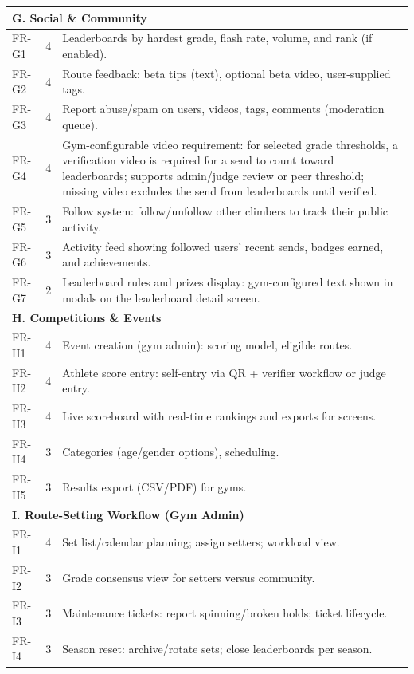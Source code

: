 \documentclass[12pt,a4paper]{report}
\renewcommand\_{\textunderscore\hspace{0pt}}
\begin{document}
\begin{longtable}{l c >{\raggedright\arraybackslash}p{11cm}}
\hline
\multicolumn{3}{l}{\textbf{G. Social \& Community}} \\
\hline
FR-G1 & 4 & Leaderboards by hardest grade, flash rate, volume, and rank (if enabled). \\
FR-G2 & 4 & Route feedback: beta tips (text), optional beta video, user-supplied tags. \\
FR-G3 & 4 & Report abuse/spam on users, videos, tags, comments (moderation queue). \\
FR-G4 & 4 & Gym-configurable video requirement: for selected grade thresholds, a verification video is required for a send to count toward leaderboards; supports admin/judge review or peer threshold; missing video excludes the send from leaderboards until verified. \\
FR-G5 & 3 & Follow system: follow/unfollow other climbers to track their public activity. \\
FR-G6 & 3 & Activity feed showing followed users' recent sends, badges earned, and achievements. \\
FR-G7 & 2 & Leaderboard rules and prizes display: gym-configured text shown in modals on the leaderboard detail screen. \\

\hline
\multicolumn{3}{l}{\textbf{H. Competitions \& Events}} \\
\hline
FR-H1 & 4 & Event creation (gym admin): scoring model, eligible routes. \\
FR-H2 & 4 & Athlete score entry: self-entry via QR + verifier workflow or judge entry. \\
FR-H3 & 4 & Live scoreboard with real-time rankings and exports for screens. \\
FR-H4 & 3 & Categories (age/gender options), scheduling. \\
FR-H5 & 3 & Results export (CSV/PDF) for gyms. \\

\hline
\multicolumn{3}{l}{\textbf{I. Route-Setting Workflow (Gym Admin)}} \\
\hline
FR-I1 & 4 & Set list/calendar planning; assign setters; workload view. \\
FR-I2 & 3 & Grade consensus view for setters versus community. \\
FR-I3 & 3 & Maintenance tickets: report spinning/broken holds; ticket lifecycle. \\
FR-I4 & 3 & Season reset: archive/rotate sets; close leaderboards per season. \\


\end{longtable}
\end{document}
